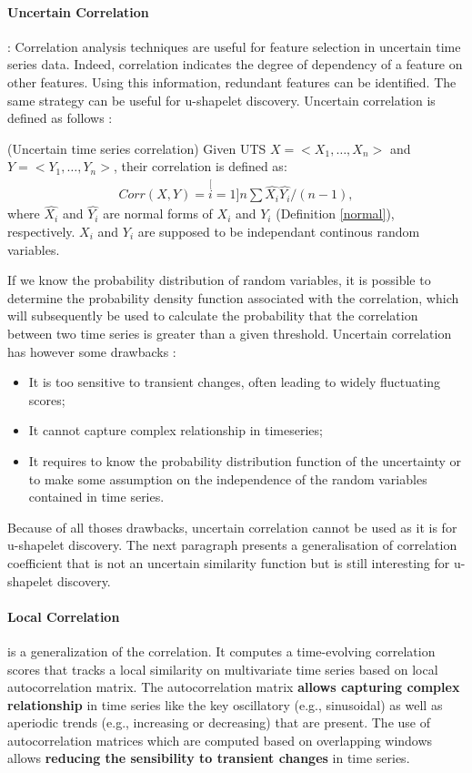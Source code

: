 \paragraph{Uncertain Correlation} \cite{Orang2017} : 
Correlation analysis techniques are useful for feature selection in uncertain time series data. Indeed, correlation indicates the degree of dependency of a feature on other features. Using this information, redundant features can be identified. The same strategy can be useful for  u-shapelet discovery.  Uncertain
correlation is defined as follows : 


\begin{definition}
(Uncertain time series correlation) Given UTS  $X = <X_1, \ldots, X_n>$ and  $Y = <Y_1, \ldots, Y_n>$, their correlation is defined as:
\begin{eqnarray}
Corr(X,Y)=\stackrel[i=1]{n}{\sum}\hat{X_{i}}\hat{Y_{i}}/(n-1),
\end{eqnarray}
where $\hat{X_{i}}$ and
$\hat{Y_{i}}$ are normal forms of $X_i$ and $Y_i$ (Definition \ref{normal}), respectively. $X_i$ and $Y_i$ are supposed to be independant continous random variables.
\end{definition}
If we know the probability distribution of random variables, it is possible to determine the probability density function associated with the correlation, which will subsequently be used to calculate the probability that the correlation between two time series is greater than a given threshold.   
Uncertain correlation has however some drawbacks :
\begin{itemize}
\item It is too sensitive to transient changes, often leading to widely fluctuating scores;
\item It cannot capture complex relationship in timeseries;
\item It requires to know the probability distribution function of the uncertainty or to make some assumption on the independence of the random variables  contained in time series.

\end{itemize}
Because of all thoses drawbacks, uncertain correlation cannot be used as it is for u-shapelet discovery. The next paragraph presents a generalisation of correlation coefficient that is not an uncertain similarity function but is still interesting for u-shapelet discovery.

\paragraph{Local Correlation} \cite{papadimitriou2007time} is a
generalization of the correlation. It computes a time-evolving correlation scores that tracks a local similarity on multivariate time series based on local autocorrelation matrix. The autocorrelation matrix \textbf{allows capturing complex relationship} in time series like the key oscillatory (e.g., sinusoidal) as well as aperiodic trends (e.g., increasing or decreasing)  that are present. The use of  autocorrelation
matrices which are computed based on overlapping windows allows \textbf{reducing the sensibility to transient changes} in time series.


